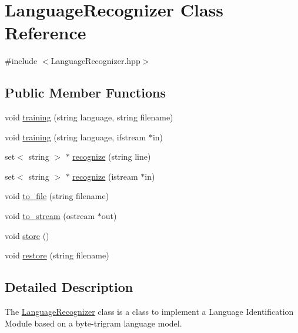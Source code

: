 \hypertarget{class_language_recognizer}{\section{Language\-Recognizer Class Reference}
\label{class_language_recognizer}
}


{\ttfamily \#include $<$Language\-Recognizer.\-hpp$>$}

\subsection*{Public Member Functions}
\begin{DoxyCompactItemize}
\item 
void \hyperlink{class_language_recognizer_a7666110539b22aa34755e596040d91d6}{training} (string language, string filename)
\item 
void \hyperlink{class_language_recognizer_a9080396f9a5a82eee0da30109b9bf447}{training} (string language, ifstream $\ast$in)
\item 
set$<$ string $>$ $\ast$ \hyperlink{class_language_recognizer_a600cf39af5a64d88c3cb72ba14dc22d3}{recognize} (string line)
\item 
set$<$ string $>$ $\ast$ \hyperlink{class_language_recognizer_a754c1a9932fae3f0860e995a5938b620}{recognize} (istream $\ast$in)
\item 
void \hyperlink{class_language_recognizer_a8fe8b4d3c7097f2975c2615a50205dde}{to\-\_\-file} (string filename)
\item 
void \hyperlink{class_language_recognizer_a6cac97de2fd002bd92db18f14676054a}{to\-\_\-stream} (ostream $\ast$out)
\item 
void \hyperlink{class_language_recognizer_a85bf44e669e17ace2342c969976574a8}{store} ()
\item 
void \hyperlink{class_language_recognizer_a294cf1e40cdc3573624959157c8a559a}{restore} (string filename)
\end{DoxyCompactItemize}


\subsection{Detailed Description}
The \hyperlink{class_language_recognizer}{Language\-Recognizer} class is a class to implement a Language Identification Module based on a byte-\/trigram language model. 

